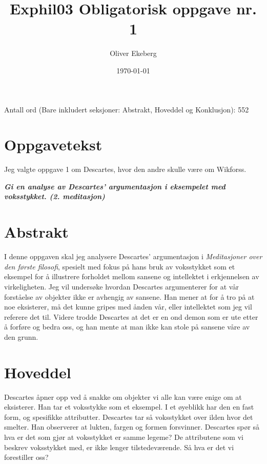 \documentclass[11pt, a4paper]{article}
\title{Exphil03 Obligatorisk oppgave nr. 1}
\author{Oliver Ekeberg}
\date{\today}
\begin{document}
\maketitle



Antall ord (Bare inkludert seksjoner: Abstrakt, Hoveddel og Konklusjon): 552



\section{Oppgavetekst}

Jeg valgte oppgave 1 om Descartes, hvor den andre skulle være om Wikforss.

\textbf{\textit{Gi en analyse av Descartes’ argumentasjon i eksempelet med voksstykket. (2. meditasjon)
}}



\section{Abstrakt}



I denne oppgaven skal jeg analysere Descartes' argumentasjon i \textit{Meditasjoner over den første filosofi}, spesielt med fokus på hans bruk av voksstykket som et eksempel for å illustrere forholdet mellom sansene og intellektet i erkjennelsen av virkeligheten. Jeg vil undersøke hvordan Descartes argumenterer for at vår forståelse av objekter ikke er avhengig av sansene. Han mener at for å tro på at noe eksisterer, må det kunne gripes med ånden vår, eller intellektet som jeg vil referere det til. Videre trodde Descartes at det er en ond demon som er ute etter å forføre og bedra oss, og han mente at man ikke kan stole på sansene våre av den grunn.


\section{Hoveddel}


Descartes åpner opp ved å snakke om objekter vi alle kan være enige om at eksisterer. Han tar et voksstykke som et eksempel. I et øyeblikk har den en fast form, og spesifikke attributter. Descartes tar så voksstykket over ilden hvor det smelter. Han observerer at lukten, fargen og formen forsvinner. Descartes spør så hva er det som gjør at voksstykket er samme legeme? De attributene som vi beskrev voksstykket med, er ikke lenger tilstedeværende. Så hva er det vi forestiller oss? 
\end{document}

